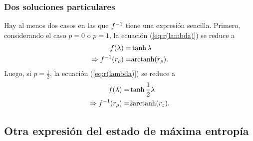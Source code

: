 \subsubsection{Dos soluciones particulares}

Hay al menos dos casos en las que $f^{-1}$ tiene una expresión sencilla. Primero, considerando el caso $p=0$ o $p=1$, la ecuación (\ref{eq:r(lambda)}) se reduce a 
\begin{align*}
f(\lambda)=&\tanh{\lambda}\\
\Rightarrow f^{-1}(r_{\rho})=&\text{arctanh}(r_{\rho}).
\end{align*}
Luego, si $p=\frac{1}{2}$, la ecuación (\ref{eq:r(lambda)}) se reduce a
\begin{align*}
    f(\lambda)=&\tanh{\frac{1}{2}\lambda}\\
    \Rightarrow f^{-1}(r_{\rho})=&2\text{arctanh}(r_{z}).
\end{align*}

\subsection{Otra expresión del estado de máxima entropía}


